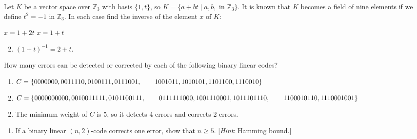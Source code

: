 \begin{multicols}{2}
\begin{ex}
Let $K$ be a vector space over $\mathbb{Z}_3$ with basis $\{1, t\}$, so $K = \{a + bt \mid a, b, \mbox{ in } \mathbb{Z}_3\}$. It is known that $K$ becomes a field of nine elements if we define $t^{2} = -1$ in $\mathbb{Z}_3$. In each case find the inverse of the element $x$ of $K$:

\begin{exenumerate}
\exitem $x = 1 + 2t$
\exitem $x = 1 + t$
\end{exenumerate}
\begin{sol}
\begin{enumerate}[label={\alph*.}]
\setcounter{enumi}{1}
\item  $(1 + t)^{-1} = 2 + t$.

\end{enumerate}
\end{sol}
\end{ex}

\begin{ex} \label{ex:8_7_10}
How many errors can be detected or corrected by each of the following binary linear codes?

\begin{enumerate}[label={\alph*.}]
\item $C = \{0000000, 0011110, 0100111, 0111001, \\ \hspace*{2em} 1001011, 1010101, 1101100, 1110010\}$

\item $C = \{0000000000, 0010011111, 0101100111,\\ \hspace*{2em} 0111111000, 1001110001, 1011101110,\\ \hspace*{2em} 1100010110, 1110001001\}$

\end{enumerate}
\begin{sol}
\begin{enumerate}[label={\alph*.}]
\setcounter{enumi}{1}
\item  The minimum weight of $C$ is $5$, so it detects $4$ errors and corrects $2$ errors.

\end{enumerate}
\end{sol}
\end{ex}

\begin{ex}
\begin{enumerate}[label={\alph*.}]
\item If a binary linear $(n, 2)$-code corrects one error, show that $n \geq 5$. [\textit{Hint}: Hamming bound.]


\end{enumerate}
\end{ex}
\end{multicols}

